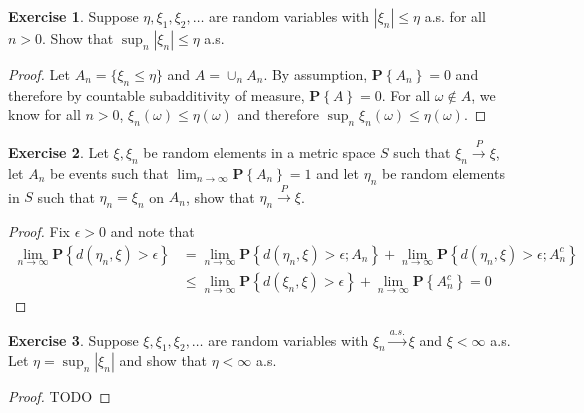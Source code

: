\documentclass{amsbook}
\theoremstyle{definition}
\newtheorem{xca}{Exercise}
\theoremstyle{remark}
\newcommand{\probability}[1]{\textbf{P}\left \{#1 \right \}}
\newcommand{\abs}[1]{\left \vert #1 \right \vert}
\newcommand{\toprob}{\overset{P}\to}
\newcommand{\toas}{\overset{a.s.}\to}
\begin{document}
\begin{xca}Suppose $\eta, \xi_1, \xi_2, \dots$ are random variables with
  $\abs{\xi_n} \leq \eta$ a.s. for all $n > 0$.  Show that $\sup_n
  \abs{\xi_n} \leq \eta$ a.s.
\end{xca}
\begin{proof}
Let $A_n = \lbrace \xi_n \leq \eta \rbrace$ and $A = \cup_n A_n$.
By assumption,
$\probability{A_n} =0$ and therefore by countable subadditivity of measure,
$\probability{A} = 0$.  For all $\omega \notin A$, we know for all
$n>0$, $\xi_n(\omega) \leq \eta(\omega)$ and therefore
$\sup_n\xi_n(\omega) \leq \eta(\omega)$.
\end{proof}

\begin{xca}\label{ExConvProb1}Let $\xi, \xi_n$ be random elements in a metric space $S$
  such that $\xi_n \toprob \xi$, let $A_n$ be events such that
  $\lim_{n \to \infty} \probability{A_n} = 1$ and let $\eta_n$ be random elements in
  $S$ such that $\eta_n = \xi_n$ on $A_n$, show that $\eta_n \toprob \xi$.
\end{xca}
\begin{proof}
Fix $\epsilon > 0$ and note that
\begin{align*}
\lim_{n \to \infty} \probability{d(\eta_n, \xi) > \epsilon} &=
\lim_{n \to \infty} \probability{d(\eta_n, \xi) > \epsilon ; A_n } +
\lim_{n \to \infty} \probability{d(\eta_n, \xi) > \epsilon;A_n^c} \\
&\leq \lim_{n \to \infty} \probability{d(\xi_n, \xi) > \epsilon } +
\lim_{n \to \infty} \probability{A^c_n} = 0
\end{align*}
\end{proof}

\begin{xca}Suppose $\xi, \xi_1, \xi_2, \dots$ are random variables with
  $\xi_n \toas \xi$ and $\xi < \infty$ a.s.  Let $\eta = \sup_n
  \abs{\xi_n}$ and show that $\eta < \infty$ a.s.
\end{xca}
\begin{proof}
TODO
\end{proof}
\end{document}

